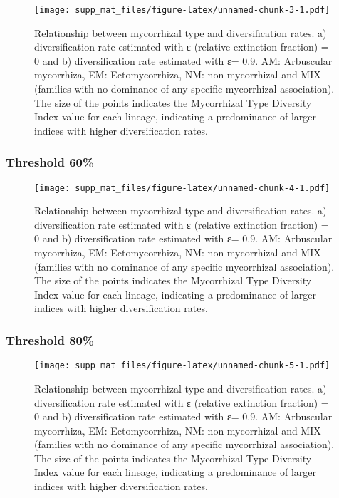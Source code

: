 \documentclass[]{article}
\begin{document}
\begin{figure}
\centering
\texttt{[image: supp\_mat\_files/figure-latex/unnamed-chunk-3-1.pdf]}
\caption{Relationship between mycorrhizal type and diversification
rates. a) diversification rate estimated with ε (relative extinction
fraction) = 0 and b) diversification rate estimated with ε= 0.9. AM:
Arbuscular mycorrhiza, EM: Ectomycorrhiza, NM: non-mycorrhizal and MIX
(families with no dominance of any specific mycorrhizal association).
The size of the points indicates the Mycorrhizal Type Diversity Index
value for each lineage, indicating a predominance of larger indices with
higher diversification rates.}
\end{figure}

\hypertarget{threshold-60}{%
\subsubsection{Threshold 60\%}\label{threshold-60}}

\begin{figure}
\centering
\texttt{[image: supp\_mat\_files/figure-latex/unnamed-chunk-4-1.pdf]}
\caption{Relationship between mycorrhizal type and diversification
rates. a) diversification rate estimated with ε (relative extinction
fraction) = 0 and b) diversification rate estimated with ε= 0.9. AM:
Arbuscular mycorrhiza, EM: Ectomycorrhiza, NM: non-mycorrhizal and MIX
(families with no dominance of any specific mycorrhizal association).
The size of the points indicates the Mycorrhizal Type Diversity Index
value for each lineage, indicating a predominance of larger indices with
higher diversification rates.}
\end{figure}

\hypertarget{threshold-80}{%
\subsubsection{Threshold 80\%}\label{threshold-80}}

\begin{figure}
\centering
\texttt{[image: supp\_mat\_files/figure-latex/unnamed-chunk-5-1.pdf]}
\caption{Relationship between mycorrhizal type and diversification
rates. a) diversification rate estimated with ε (relative extinction
fraction) = 0 and b) diversification rate estimated with ε= 0.9. AM:
Arbuscular mycorrhiza, EM: Ectomycorrhiza, NM: non-mycorrhizal and MIX
(families with no dominance of any specific mycorrhizal association).
The size of the points indicates the Mycorrhizal Type Diversity Index
value for each lineage, indicating a predominance of larger indices with
higher diversification rates.}
\end{figure}
\end{document}
